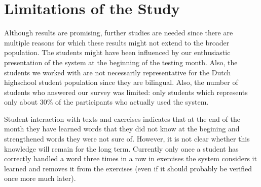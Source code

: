 


\section{Limitations of the Study}
\label{sec:limitations}

Although results are promising, further studies are needed since there are multiple reasons for which these results might not extend to the broader population. 
The students might have been influenced by our enthusiastic presentation of the system at the beginning of the testing month. 
Also, the students we worked with are not necessarily representative for the Dutch highschool student population since they are bilingual. 
Also, the number of students who answered our survey was limited: only \surveyrespondents students which represents only about 30\% of the participants who actually used the system.





Student interaction with texts and exercises indicates that at the end of the month they have learned words that they did not know at the begining and strengthened words they were not sure of. However, it is not clear whether this knowledge will remain for the long term. Currently only once a student has correctly handled a word three times in a row in exercises the system considers it learned and removes it from the exercises (even if it should probably be verified once more much later).

